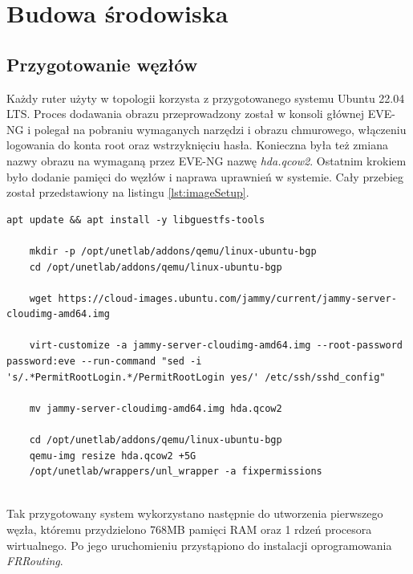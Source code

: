 \chapter{Budowa środowiska}
\label{chapter-4}
\section{Przygotowanie węzłów}

Każdy ruter użyty w topologii korzysta z przygotowanego systemu Ubuntu 22.04 LTS. Proces dodawania obrazu przeprowadzony został w konsoli głównej EVE-NG i polegał na pobraniu wymaganych narzędzi i obrazu chmurowego, włączeniu logowania do konta root oraz wstrzyknięciu hasła. Konieczna była też zmiana nazwy obrazu na wymaganą przez EVE-NG nazwę \textit{hda.qcow2}. Ostatnim krokiem było dodanie pamięci do węzłów i naprawa uprawnień w systemie. Cały przebieg został przedstawiony na listingu \ref{lst:imageSetup}.
\begin{lstlisting}[caption={Przygotowanie obrazu systemu}, label={lst:imageSetup}]
	apt update && apt install -y libguestfs-tools 

	mkdir -p /opt/unetlab/addons/qemu/linux-ubuntu-bgp 
	cd /opt/unetlab/addons/qemu/linux-ubuntu-bgp 

	wget https://cloud-images.ubuntu.com/jammy/current/jammy-server-cloudimg-amd64.img 

	virt-customize -a jammy-server-cloudimg-amd64.img --root-password password:eve --run-command "sed -i 's/.*PermitRootLogin.*/PermitRootLogin yes/' /etc/ssh/sshd_config" 

	mv jammy-server-cloudimg-amd64.img hda.qcow2 
	
	cd /opt/unetlab/addons/qemu/linux-ubuntu-bgp 
	qemu-img resize hda.qcow2 +5G 
	/opt/unetlab/wrappers/unl_wrapper -a fixpermissions 
	
\end{lstlisting}

Tak przygotowany system wykorzystano następnie do utworzenia pierwszego węzła, któremu przydzielono 768MB pamięci RAM oraz 1 rdzeń procesora wirtualnego. Po jego uruchomieniu przystąpiono do instalacji oprogramowania \textit{FRRouting}. 

